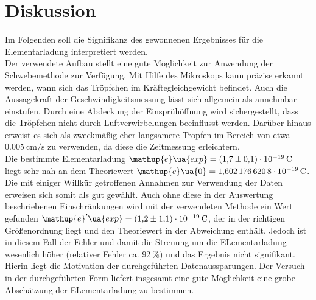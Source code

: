 \section{Diskussion}
Im Folgenden soll die Signifikanz des gewonnenen Ergebnisses für die Elementarladung interpretiert werden. \\
Der verwendete Aufbau stellt eine gute Möglichkeit zur Anwendung der Schwebemethode zur Verfügung. Mit Hilfe des Mikroskops
kann präzise erkannt werden, wann sich das Tröpfchen im Kräftegleichgewicht befindet. Auch die Aussagekraft der Geschwindigkeitsmessung lässt
sich allgemein als annehmbar einstufen. Durch eine Abdeckung der Einsprühöffnung wird sichergestellt, dass die
Tröpfchen nicht durch Luftverwirbelungen beeinflusst werden. Darüber hinaus erweist es sich als zweckmäßig eher langsamere Tropfen
im Bereich von etwa $\SI{0.005}{\centi\meter \per \second}$ zu verwenden, da diese die Zeitmessung erleichtern. \\
Die bestimmte Elementarladung $\mathup{e}\ua{exp} = \SI{+1.7(1)e-19}{\coulomb}$ liegt sehr nah an dem Theoriewert
$\mathup{e}\ua{0} = \SI{1.6021766208e-19}{\coulomb}$. Die mit einiger Willkür getroffenen Annahmen zur Verwendung der Daten erweisen sich
somit als gut gewählt. Auch ohne diese in der Auswertung beschriebenen Einschränkungen wird mit der verwendeten Methode ein Wert gefunden
$\mathup{e}'\ua{exp} = \SI{+1.2(11)e-19}{\coulomb}$, der in der richtigen Größenordnung liegt und den Theoriewert in der Abweichung enthält. Jedoch ist in
diesem Fall der Fehler und damit die Streuung um die ELementarladung wesenlich höher (relativer Fehler ca. $\SI{92}{\percent}$) und das Ergebnis %
nicht signifikant. Hierin liegt die Motivation der durchgeführten Datenaussparungen. %
Der Versuch in der durchgeführten Form liefert insgesamt eine gute Möglichkeit eine grobe Abschätzung der ELementarladung zu bestimmen.

